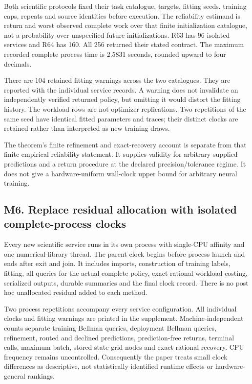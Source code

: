 \documentclass[ecta,nameyear,draft]{econsocart}
\begin{document}
Both scientific protocols fixed their task catalogue, targets, fitting
seeds, training caps, repeats and source identities before execution.
The reliability estimand is return and worst observed complete work over
that finite initialization catalogue, not a probability over unspecified
future initializations. R63 has 96 isolated services and R64 has 160.
All 256 returned their stated contract. The maximum recorded complete
process time is 2.5831 seconds, rounded upward to four decimals.

There are 104 retained fitting warnings across the two catalogues. They
are reported with the individual service records. A warning does not
invalidate an independently verified returned policy, but omitting it
would distort the fitting history. The workload rows are not optimizer
replications. Two repetitions of the same seed have identical fitted
parameters and traces; their distinct clocks are retained rather than
interpreted as new training draws.

The theorem's finite refinement and exact-recovery account is separate
from that finite empirical reliability statement. It supplies validity
for arbitrary supplied predictions and a return procedure at the
declared precision/tolerance regime. It does not give a hardware-uniform
wall-clock upper bound for arbitrary neural training.

\hypertarget{m6.-replace-residual-allocation-with-isolated-complete-process-clocks}{%
\subsection{M6. Replace residual allocation with isolated
complete-process
clocks}\label{m6.-replace-residual-allocation-with-isolated-complete-process-clocks}}

Every new scientific service runs in its own process with single-CPU
affinity and one numerical-library thread. The parent clock begins
before process launch and ends after exit and join. It includes imports,
construction of training labels, fitting, all queries for the actual
complete policy, exact rational workload costing, serialized outputs,
durable summaries and the final clock record. There is no post hoc
unallocated residual added to each method.

Two process repetitions accompany every service configuration. All
individual clocks and fitting warnings are printed in the supplement.
Machine-independent counts separate training Bellman queries, deployment
Bellman queries, refinement, routed and declined predictions,
prediction-free returns, terminal calls, maximum batch, stored
state-grid nodes and exact-rational recovery. CPU frequency remains
uncontrolled. Consequently the paper treats small clock differences as
descriptive, not statistically identified runtime effects or
hardware-general rankings.
\end{document}
